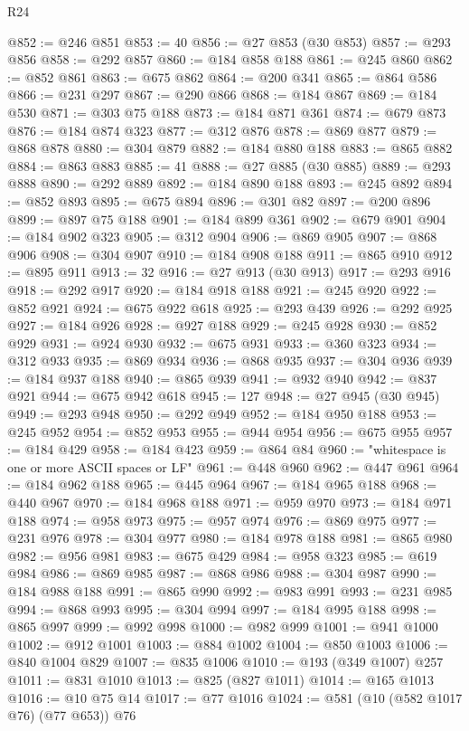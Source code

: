 \begin{lexlean}{R24}
\begin{coremodule}
@852 := @246 @851
@853 := 40
@856 := @27 @853 (@30 @853)
@857 := @293 @856
@858 := @292 @857
@860 := @184 @858 @188
@861 := @245 @860
@862 := @852 @861
@863 := @675 @862
@864 := @200 @341
@865 := @864 @586
@866 := @231 @297
@867 := @290 @866
@868 := @184 @867
@869 := @184 @530
@871 := @303 @75 @188
@873 := @184 @871 @361
@874 := @679 @873
@876 := @184 @874 @323
@877 := @312 @876
@878 := @869 @877
@879 := @868 @878
@880 := @304 @879
@882 := @184 @880 @188
@883 := @865 @882
@884 := @863 @883
@885 := 41
@888 := @27 @885 (@30 @885)
@889 := @293 @888
@890 := @292 @889
@892 := @184 @890 @188
@893 := @245 @892
@894 := @852 @893
@895 := @675 @894
@896 := @301 @82
@897 := @200 @896
@899 := @897 @75 @188
@901 := @184 @899 @361
@902 := @679 @901
@904 := @184 @902 @323
@905 := @312 @904
@906 := @869 @905
@907 := @868 @906
@908 := @304 @907
@910 := @184 @908 @188
@911 := @865 @910
@912 := @895 @911
@913 := 32
@916 := @27 @913 (@30 @913)
@917 := @293 @916
@918 := @292 @917
@920 := @184 @918 @188
@921 := @245 @920
@922 := @852 @921
@924 := @675 @922 @618
@925 := @293 @439
@926 := @292 @925
@927 := @184 @926
@928 := @927 @188
@929 := @245 @928
@930 := @852 @929
@931 := @924 @930
@932 := @675 @931
@933 := @360 @323
@934 := @312 @933
@935 := @869 @934
@936 := @868 @935
@937 := @304 @936
@939 := @184 @937 @188
@940 := @865 @939
@941 := @932 @940
@942 := @837 @921
@944 := @675 @942 @618
@945 := 127
@948 := @27 @945 (@30 @945)
@949 := @293 @948
@950 := @292 @949
@952 := @184 @950 @188
@953 := @245 @952
@954 := @852 @953
@955 := @944 @954
@956 := @675 @955
@957 := @184 @429
@958 := @184 @423
@959 := @864 @84
@960 := "whitespace is one or more ASCII spaces or LF"
@961 := @448 @960
@962 := @447 @961
@964 := @184 @962 @188
@965 := @445 @964
@967 := @184 @965 @188
@968 := @440 @967
@970 := @184 @968 @188
@971 := @959 @970
@973 := @184 @971 @188
@974 := @958 @973
@975 := @957 @974
@976 := @869 @975
@977 := @231 @976
@978 := @304 @977
@980 := @184 @978 @188
@981 := @865 @980
@982 := @956 @981
@983 := @675 @429
@984 := @958 @323
@985 := @619 @984
@986 := @869 @985
@987 := @868 @986
@988 := @304 @987
@990 := @184 @988 @188
@991 := @865 @990
@992 := @983 @991
@993 := @231 @985
@994 := @868 @993
@995 := @304 @994
@997 := @184 @995 @188
@998 := @865 @997
@999 := @992 @998
@1000 := @982 @999
@1001 := @941 @1000
@1002 := @912 @1001
@1003 := @884 @1002
@1004 := @850 @1003
@1006 := @840 @1004 @829
@1007 := @835 @1006
@1010 := @193 (@349 @1007) @257
@1011 := @831 @1010
@1013 := @825 (@827 @1011)
@1014 := @165 @1013
@1016 := @10 @75 @14
@1017 := @77 @1016
@1024 := @581 (@10 (@582 @1017 @76) (@77 @653)) @76

\end{coremodule}
\end{lexlean}

